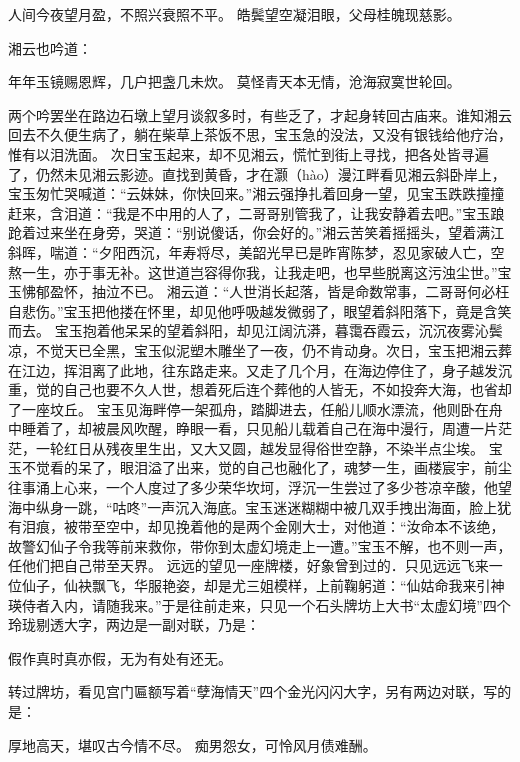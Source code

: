 \documentclass[12pt,oneside]{book}
\begin{document}
人间今夜望月盈，不照兴衰照不平。
皓鬓望空凝泪眼，父母桂魄现慈影。

湘云也吟道：

年年玉镜赐恩辉，几户把盏几未炊。
莫怪青天本无情，沧海寂寞世轮回。

两个吟罢坐在路边石墩上望月谈叙多时，有些乏了，才起身转回古庙来。谁知湘云回去不久便生病了，躺在柴草上茶饭不思，宝玉急的没法，又没有银钱给他疗治，惟有以泪洗面。
次日宝玉起来，却不见湘云，慌忙到街上寻找，把各处皆寻遍了，仍然未见湘云影迹。直找到黄昏，才在灏（hào）漫江畔看见湘云斜卧岸上，宝玉匆忙哭喊道：“云妹妹，你快回来。”湘云强挣扎着回身一望，见宝玉跌跌撞撞赶来，含泪道：“我是不中用的人了，二哥哥别管我了，让我安静着去吧。”宝玉踉跄着过来坐在身旁，哭道：“别说傻话，你会好的。”湘云苦笑着摇摇头，望着满江斜晖，喘道：“夕阳西沉，年寿将尽，美韶光早已是昨宵陈梦，忍见家破人亡，空熬一生，亦于事无补。这世道岂容得你我，让我走吧，也早些脱离这污浊尘世。”宝玉怫郁盈怀，抽泣不已。
湘云道：“人世消长起落，皆是命数常事，二哥哥何必枉自悲伤。”宝玉把他搂在怀里，却见他呼吸越发微弱了，眼望着斜阳落下，竟是含笑而去。
宝玉抱着他呆呆的望着斜阳，却见江阔沆漭，暮霭吞霞云，沉沉夜雾沁鬓凉，不觉天已全黑，宝玉似泥塑木雕坐了一夜，仍不肯动身。次日，宝玉把湘云葬在江边，挥泪离了此地，往东路走来。又走了几个月，在海边停住了，身子越发沉重，觉的自己也要不久人世，想着死后连个葬他的人皆无，不如投奔大海，也省却了一座坟丘。
宝玉见海畔停一架孤舟，踏脚进去，任船儿顺水漂流，他则卧在舟中睡着了，却被晨风吹醒，睁眼一看，只见船儿载着自己在海中漫行，周遭一片茫茫，一轮红日从残夜里生出，又大又圆，越发显得俗世空静，不染半点尘埃。
宝玉不觉看的呆了，眼泪溢了出来，觉的自己也融化了，魂梦一生，画楼宸宇，前尘往事涌上心来，一个人度过了多少荣华坎坷，浮沉一生尝过了多少苍凉辛酸，他望海中纵身一跳，“咕咚”一声沉入海底。宝玉迷迷糊糊中被几双手拽出海面，脸上犹有泪痕，被带至空中，却见挽着他的是两个金刚大士，对他道：“汝命本不该绝，故警幻仙子令我等前来救你，带你到太虚幻境走上一遭。”宝玉不解，也不则一声，任他们把自己带至天界。
远远的望见一座牌楼，好象曾到过的．只见远远飞来一位仙子，仙袂飘飞，华服艳姿，却是尤三姐模样，上前鞠躬道：“仙姑命我来引神瑛侍者入内，请随我来。”于是往前走来，只见一个石头牌坊上大书“太虚幻境”四个玲珑剔透大字，两边是一副对联，乃是：

假作真时真亦假，无为有处有还无。

转过牌坊，看见宫门匾额写着“孽海情天”四个金光闪闪大字，另有两边对联，写的是：

厚地高天，堪叹古今情不尽。
痴男怨女，可怜风月债难酬。
\end{document}
